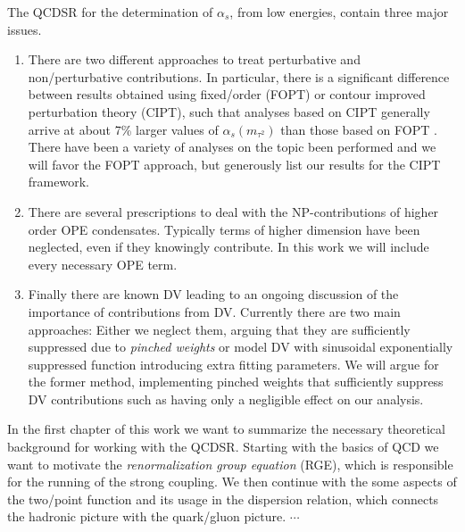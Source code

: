 \documentclass[../../index.tex]{subfiles}
\begin{document}
The QCDSR for the determination of $\alpha_s$, from low energies, contain three major issues.
\begin{enumerate}
  \item There are two different approaches to treat perturbative and non\-/perturbative
contributions. In particular, there is a significant difference between results
obtained using fixed\-/order (FOPT) or contour improved perturbation theory
(CIPT), such that analyses based on CIPT generally arrive at about 7\% larger
values of $\alpha_s(m_{\tau^2})$ than those based on FOPT \cite{PDG2018}.
There have been a variety of analyses on the topic been performed
\cite{Pich2013,Caprini2009,Jamin2005} and we will favor the FOPT approach,
but generously list our results for the CIPT framework.

  \item There are several prescriptions to deal with the NP-contributions of
    higher order OPE condensates. Typically terms of higher dimension have been
    neglected, even if they knowingly contribute. In this work we will include
    every necessary OPE term.

  \item Finally there are known DV leading to an ongoing discussion of the
importance of contributions from DV. Currently there are two main approaches:
Either we neglect them, arguing that they are sufficiently suppressed due to
\textit{pinched weights} \cite{Pich2016} or model DV with sinusoidal
exponentially suppressed function \cite{Cata2008,Boito2011,Boito2014} introducing
extra fitting parameters. We will argue for the former method, implementing
pinched weights that sufficiently suppress DV contributions such as having only a negligible effect on our analysis.
\end{enumerate}

In the first chapter of this work we want to summarize the necessary theoretical
background for working with the QCDSR. Starting with the basics of QCD we want to motivate the
\textit{renormalization group equation} (RGE), which is responsible for the
running of the strong coupling. We then continue with the some
aspects of the two\-/point function and its usage in the dispersion relation,
which connects the hadronic picture with the quark\-/gluon picture. $\cdots$
\end{document}
